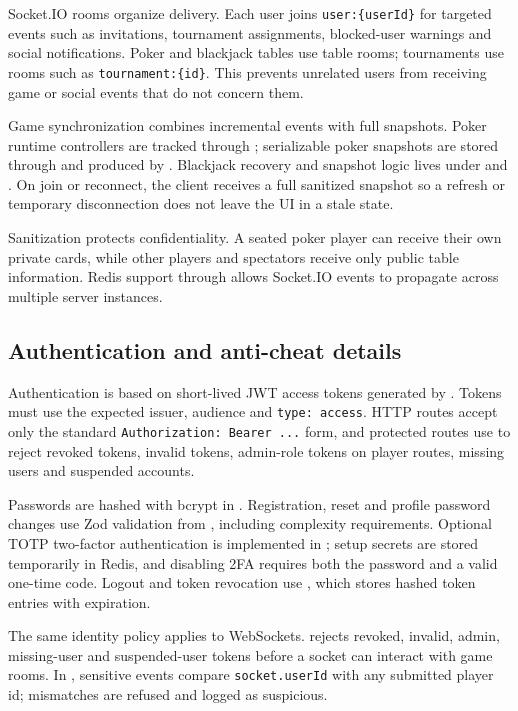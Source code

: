 \documentclass[11pt,a4paper]{article}
\begin{document}
Socket.IO rooms organize delivery. Each user joins \texttt{user:\{userId\}} for targeted events such as invitations, tournament assignments, blocked-user warnings and social notifications. Poker and blackjack tables use table rooms; tournaments use rooms such as \texttt{tournament:\{id\}}. This prevents unrelated users from receiving game or social events that do not concern them.

Game synchronization combines incremental events with full snapshots. Poker runtime controllers are tracked through ; serializable poker snapshots are stored through  and produced by . Blackjack recovery and snapshot logic lives under  and . On join or reconnect, the client receives a full sanitized snapshot so a refresh or temporary disconnection does not leave the UI in a stale state.

Sanitization protects confidentiality. A seated poker player can receive their own private cards, while other players and spectators receive only public table information. Redis support through  allows Socket.IO events to propagate across multiple server instances.

\subsection{Authentication and anti-cheat details}

Authentication is based on short-lived JWT access tokens generated by . Tokens must use the expected issuer, audience and \texttt{type: access}. HTTP routes accept only the standard \texttt{Authorization: Bearer ...} form, and protected routes use  to reject revoked tokens, invalid tokens, admin-role tokens on player routes, missing users and suspended accounts.

Passwords are hashed with bcrypt in . Registration, reset and profile password changes use Zod validation from , including complexity requirements. Optional TOTP two-factor authentication is implemented in ; setup secrets are stored temporarily in Redis, and disabling 2FA requires both the password and a valid one-time code. Logout and token revocation use , which stores hashed token entries with expiration.

The same identity policy applies to WebSockets.  rejects revoked, invalid, admin, missing-user and suspended-user tokens before a socket can interact with game rooms. In , sensitive events compare \texttt{socket.userId} with any submitted player id; mismatches are refused and logged as suspicious.
\end{document}
